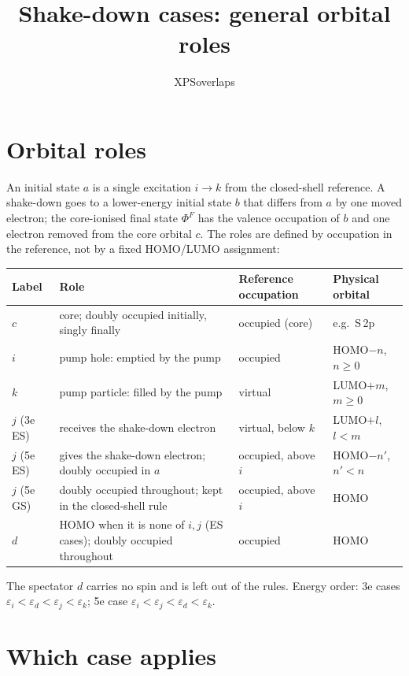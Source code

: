 \documentclass[11pt]{article}
\title{Shake-down cases: general orbital roles}
\author{XPSoverlaps}
\date{}
\begin{document}
\maketitle
\vspace{-2em}

\section{Orbital roles}

An initial state $a$ is a single excitation $i\to k$ from the closed-shell reference.
A shake-down goes to a lower-energy initial state $b$ that differs from $a$ by one
moved electron; the core-ionised final state $\Phi^F$ has the valence occupation of $b$
and one electron removed from the core orbital $c$. The roles are defined by
occupation in the reference, not by a fixed HOMO/LUMO assignment:

\medskip\noindent
\begin{tabularx}{\textwidth}{@{}l>{\raggedright\arraybackslash}Xll@{}}
\toprule
Label & Role & Reference occupation & Physical orbital \\
\midrule
$c$ & core; doubly occupied initially, singly finally & occupied (core) & e.g.\ S\,2p \\
$i$ & pump hole: emptied by the pump & occupied & HOMO$-n$, $n\ge 0$ \\
$k$ & pump particle: filled by the pump & virtual & LUMO$+m$, $m\ge 0$ \\
$j$ (3e ES) & receives the shake-down electron & virtual, below $k$ & LUMO$+l$, $l<m$ \\
$j$ (5e ES) & gives the shake-down electron; doubly occupied in $a$ & occupied, above $i$ & HOMO$-n'$, $n'<n$ \\
$j$ (5e GS) & doubly occupied throughout; kept in the closed-shell rule & occupied, above $i$ & HOMO \\
$d$ & HOMO when it is none of $i, j$ (ES cases); doubly occupied throughout & occupied & HOMO \\
\bottomrule
\end{tabularx}
\medskip


The spectator $d$ carries no spin and is left out of the rules. Energy order:
3e cases $\varepsilon_i<\varepsilon_d<\varepsilon_j<\varepsilon_k$;
5e case $\varepsilon_i<\varepsilon_j<\varepsilon_d<\varepsilon_k$.

\section{Which case applies}
\end{document}

